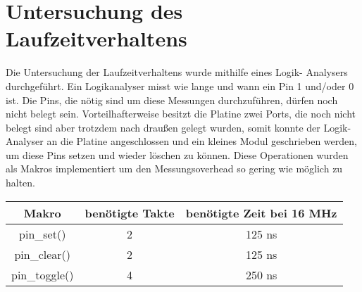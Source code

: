 \chapter{Untersuchung des Laufzeitverhaltens}
Die Untersuchung der Laufzeitverhaltens wurde mithilfe eines Logik-
Analysers durchgeführt. Ein Logikanalyser misst wie lange und wann
ein Pin 1 und/oder 0 ist. Die Pins, die nötig sind um diese Messungen
durchzuführen, dürfen noch nicht belegt sein. Vorteilhafterweise
besitzt die Platine zwei Ports, die noch nicht belegt sind aber
trotzdem nach draußen gelegt wurden, somit konnte der Logik-
Analyser an die Platine angeschlossen und ein kleines Modul
geschrieben werden, um diese Pins setzen und wieder löschen zu
können. Diese Operationen wurden als Makros implementiert um den
Messungsoverhead so gering wie möglich zu halten.
\begin{center}
\begin{tabular}{|c||c|c|}
\hline
\textbf{Makro} & \textbf{benötigte Takte} & \textbf{benötigte Zeit bei 16 MHz} \\ \hline \hline
pin\_set() & 2 & 125 ns \\ \hline
pin\_clear() & 2 & 125 ns \\ \hline
pin\_toggle() & 4 & 250 ns \\ \hline
\end{tabular}
\end{center}
